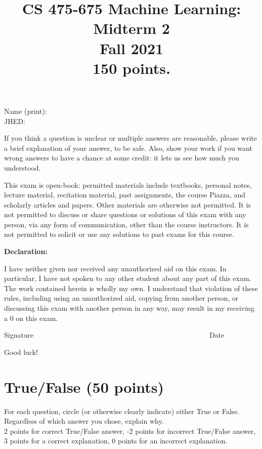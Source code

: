 \documentclass[11pt]{article}
\title{CS 475-675 Machine Learning: Midterm 2\\
\Large{Fall 2021}\\
150 points. }
\author{}
\date{}
\begin{document}
\large
\maketitle
\thispagestyle{headings}

\vspace{-.5in}
\noindent Name (print):
\underline{} \\

\noindent JHED:
\underline{}


 \vspace{3cm}
 If you think a question is unclear or multiple answers are reasonable, please write a brief explanation of your answer,
 to be safe. Also, show your work if you want wrong answers to have a chance at some credit: it lets us see how much you understood.

 This exam is open-book: permitted materials include textbooks, personal notes, lecture material, recitation material, past assignments, the course Piazza, and scholarly articles and papers. Other materials are otherwise not permitted. It is not permitted to discuss or share questions or solutions of this exam with any person, via any form of communication, other than the course instructors.  It is not permitted to solicit or use any solutions to past exams for this course.
 \vspace{1cm}

 \textbf{ Declaration:}

I have neither given nor received any unauthorized aid on this exam. In particular, I have not spoken to any other student about any part of this exam.
The work contained herein is wholly my own.  I understand that violation of these rules, including using an unauthorized aid, copying from another person,
or discussing this exam with another person in any way, may result in my receiving a 0 on this exam.
\begin{center}
\noindent\underline{\makebox[6in][l]{}}

 Signature ~~~~~~~~~~~~~~~~~~~~~~~~~~~~~~~~~~~~~~~~~~~~~~~~~Date


 \vspace{3cm}
 Good luck!
 \end{center}

\newpage

\section*{True/False (50 points)}
For each question, circle (or otherwise clearly indicate) either True or False.  Regardless of which answer you chose, explain why.\\
2 points for correct True/False answer, -2 points for incorrect True/False answer, 3 points for a correct explanation, 0 points for an incorrect explanation.\\
\end{document}
